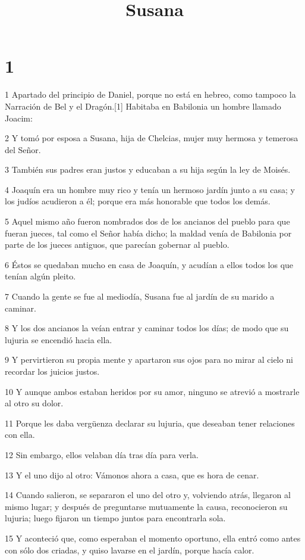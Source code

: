 

\title{Susana}


\chapter{1}

\par 1 Apartado del principio de Daniel, porque no está en hebreo, como tampoco la Narración de Bel y el Dragón.[1] Habitaba en Babilonia un hombre llamado Joacim:
\par 2 Y tomó por esposa a Susana, hija de Chelcias, mujer muy hermosa y temerosa del Señor.
\par 3 También sus padres eran justos y educaban a su hija según la ley de Moisés.
\par 4 Joaquín era un hombre muy rico y tenía un hermoso jardín junto a su casa; y los judíos acudieron a él; porque era más honorable que todos los demás.
\par 5 Aquel mismo año fueron nombrados dos de los ancianos del pueblo para que fueran jueces, tal como el Señor había dicho; la maldad venía de Babilonia por parte de los jueces antiguos, que parecían gobernar al pueblo.
\par 6 Éstos se quedaban mucho en casa de Joaquín, y acudían a ellos todos los que tenían algún pleito.
\par 7 Cuando la gente se fue al mediodía, Susana fue al jardín de su marido a caminar.
\par 8 Y los dos ancianos la veían entrar y caminar todos los días; de modo que su lujuria se encendió hacia ella.
\par 9 Y pervirtieron su propia mente y apartaron sus ojos para no mirar al cielo ni recordar los juicios justos.
\par 10 Y aunque ambos estaban heridos por su amor, ninguno se atrevió a mostrarle al otro su dolor.
\par 11 Porque les daba vergüenza declarar su lujuria, que deseaban tener relaciones con ella.
\par 12 Sin embargo, ellos velaban día tras día para verla.
\par 13 Y el uno dijo al otro: Vámonos ahora a casa, que es hora de cenar.
\par 14 Cuando salieron, se separaron el uno del otro y, volviendo atrás, llegaron al mismo lugar; y después de preguntarse mutuamente la causa, reconocieron su lujuria; luego fijaron un tiempo juntos para encontrarla sola.
\par 15 Y aconteció que, como esperaban el momento oportuno, ella entró como antes con sólo dos criadas, y quiso lavarse en el jardín, porque hacía calor.
